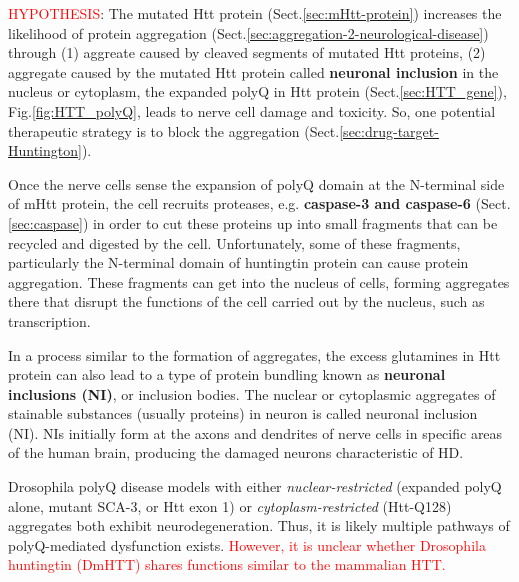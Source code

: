 \textcolor{red}{HYPOTHESIS}: The mutated Htt protein
(Sect.\ref{sec:mHtt-protein}) increases the likelihood of protein aggregation
(Sect.\ref{sec:aggregation-2-neurological-disease}) through (1) aggreate caused
by cleaved segments of mutated Htt proteins, (2) aggregate caused by the mutated
Htt protein called {\bf neuronal inclusion} in the nucleus or cytoplasm, the
expanded polyQ in Htt protein (Sect.\ref{sec:HTT_gene}),
Fig.\ref{fig:HTT_polyQ}, leads to nerve cell damage and toxicity. So, one
potential therapeutic strategy is to block the aggregation
(Sect.\ref{sec:drug-target-Huntington}).


\begin{mdframed}

Once the nerve cells sense the expansion of polyQ domain at the N-terminal side
of mHtt protein, the cell recruits proteases, e.g. {\bf caspase-3 and caspase-6}
(Sect.\ref{sec:caspase}) in order to cut these proteins up into small fragments
that can be recycled and digested by the cell.
Unfortunately, some of these fragments, particularly the N-terminal domain of
huntingtin protein can cause protein aggregation.
These fragments can get into the nucleus of cells, forming aggregates there that
disrupt the functions of the cell carried out by the nucleus, such as
transcription.

In a process similar to the formation of aggregates, the excess glutamines in
Htt protein can also lead to a type of protein bundling known as {\bf neuronal
inclusions (NI)}, or inclusion bodies. 
The nuclear or cytoplasmic aggregates of stainable
substances (usually proteins) in neuron is called neuronal inclusion (NI).
NIs initially form at the axons and dendrites of nerve cells in specific areas
of the human brain, producing the damaged neurons characteristic of HD.

\end{mdframed}

 
Drosophila polyQ disease models with either {\it nuclear-restricted} (expanded
polyQ alone, mutant SCA-3, or Htt exon 1) or {\it cytoplasm-restricted}
(Htt-Q128) aggregates both exhibit neurodegeneration. Thus, it is likely
multiple pathways of polyQ-mediated dysfunction exists.
\textcolor{red}{However, it is unclear whether Drosophila huntingtin (DmHTT)
shares functions similar to the mammalian HTT.}

